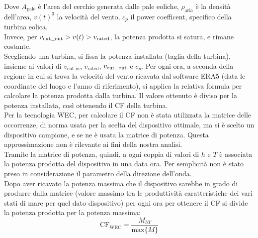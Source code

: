\documentclass[fleqn,10pt]{SelfArx} %
\begin{document}
Dove \(A_{\text{pale}}\) è l'area del cerchio generata dalle pale eoliche, \(\rho_{\text{aria}}\) è la densità dell'area, \(v(t)^3\) la velocità del vento, \(c_p\) il power coefficent, specifico della turbina eolica. \\
Invece, per \(v_{\text{cut\_out}} > v(t) > v_{\text{rated}}\), la potenza prodotta si satura, e rimane costante. \\
Scegliendo una turbina, si fissa la potenza installata (taglia della turbina), insieme ai valori di
$v_{\text{cut\_in}}$, $v_{\text{rated}}$, $v_{\text{cut\_out}}$ e $c_p$. 
Per ogni ora, a seconda della regione in cui si trova la velocità del vento ricavata dal software ERA5 (data le coordinate del luogo e l'anno di riferimento), si applica la relativa formula per calcolare la potenza prodotta dalla turbina. 
Il valore ottenuto è diviso per la potenza installata, così ottenendo il CF della turbina. \\
Per la tecnologia WEC, per calcolare il CF non è stata utilizzata la matrice delle occorrenze, di norma usata per la scelta del dispositivo ottimale, ma si è scelto un dispositivo campione, e se ne è usata la matrice di potenza. 
Questa approssimazione non è rilevante ai fini della nostra analisi. \\
Tramite la matrice di potenza, quindi, a ogni coppia di valori di $h$ e $T$ è associata la potenza prodotta del dispositivo in una data ora.
Per semplicità non è stato preso in considerazione il parametro della direzione dell'onda. \\
Dopo aver ricavato la potenza massima che il dispositivo sarebbe in grado di produrre dalla matrice (valore massimo tra le produttività caratteristiche dei vari stati di mare per quel dato dispositivo) per ogni ora per ottenere il CF si divide la potenza prodotta per la potenza massima:
\begin{equation}
	\text{CF}_\text{WEC} = \frac{M_{hT}}{\text{max}\{M\}}
\end{equation}
\end{document}
